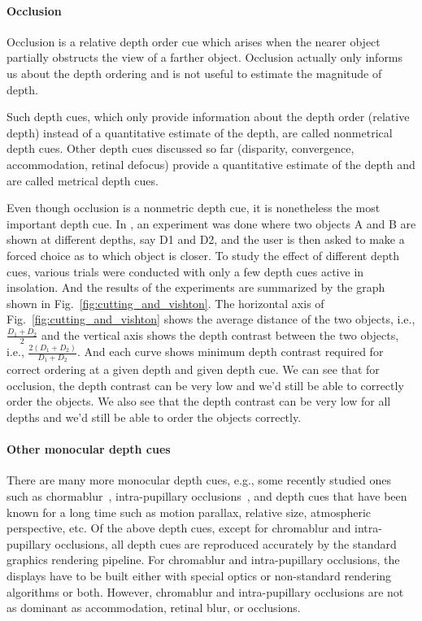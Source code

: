 \paragraph{Occlusion} Occlusion is a relative depth order cue which arises when the nearer object partially obstructs the view of a farther object. 
Occlusion actually only informs us about the depth ordering and is not useful to estimate the magnitude of depth. 

Such depth cues, which only provide information about the depth order (relative depth) instead of a quantitative estimate of the depth, are called nonmetrical depth cues. 
Other depth cues discussed so far (disparity, convergence, accommodation, retinal defocus) provide a quantitative estimate of the depth and are called metrical depth cues. 



Even though occlusion is a nonmetric depth cue, it is nonetheless the most important depth cue. 
In \cite{cutting1995perceiving}, an experiment was done where two objects A and B are shown at different depths, say D1 and D2, and the user is then asked to make a forced choice as to which object is closer. 
To study the effect of different depth cues, various trials were conducted with only a few depth cues active in insolation. 
And the results of the experiments are summarized by the graph shown in Fig.~\ref{fig:cutting_and_vishton}. 
The horizontal axis of Fig.~\ref{fig:cutting_and_vishton} shows the average distance of the two objects, i.e., $\frac{D_1 + D_2}{2}$ and the vertical axis shows the depth contrast between the two objects, i.e., $\frac{2\left(D_1 + D_2\right)}{D_1 + D_2}$.
And each curve shows minimum depth contrast required for correct ordering at a given depth and given depth cue. 
We can see that for occlusion, the depth contrast can be very low and we’d still be able to correctly order the objects. 
We also see that the depth contrast can be very low for all depths and we’d still be able to order the objects correctly. 

\paragraph{Other monocular depth cues} There are many more monocular depth cues, e.g., some recently studied ones such as chormablur~\cite{cholewiak2017chromablur}, intra-pupillary occlusions~\cite{zannoli2016blur}, and depth cues that have been known for a long time such as motion parallax, relative size, atmospheric perspective, etc. 
Of the above depth cues, except for chromablur and intra-pupillary occlusions, all depth cues are reproduced accurately by the standard graphics rendering pipeline. 
For chromablur and intra-pupillary occlusions, the displays have to be built either with special optics or non-standard rendering algorithms or both. 
However, chromablur and intra-pupillary occlusions are not as dominant as accommodation, retinal blur, or occlusions.

